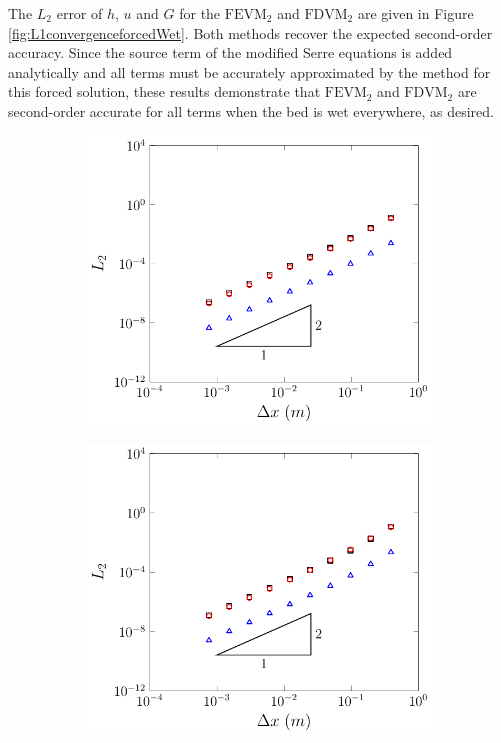 The $L_2$ error of $h$, $u$ and $G$ for the $\text{FEVM}_2$ and $\text{FDVM}_2$ are given in Figure \ref{fig:L1convergenceforcedWet}. Both methods recover the expected second-order accuracy. Since the source term of the modified Serre equations is added analytically and all terms must be accurately approximated by the method for this forced solution, these results demonstrate that $\text{FEVM}_2$ and $\text{FDVM}_2$ are second-order accurate for all terms when the bed is wet everywhere, as desired.

\begin{figure}
	\centering
	\begin{subfigure}{0.5\textwidth}
		\includegraphics[width=\textwidth]{./chp5/figures/Forced/Wet/FEVML2.pdf}
	\end{subfigure}%
	\begin{subfigure}{0.5\textwidth}
		\includegraphics[width=\textwidth]{./chp5/figures/Forced/Wet/FDVML2.pdf}

\end{subfigure}
\end{figure}

